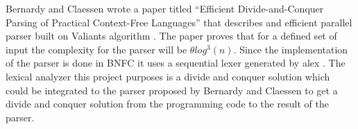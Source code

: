 Bernardy and Claessen \cite{bernardyefficient2013} wrote a paper titled 
``Efficient Divide-and-Conquer Parsing of Practical Context-Free Languages''
that describes and efficient parallel parser built on Valiants algorithm
\cite{valiantgeneral1975}. The paper proves that for a defined set of input
the complexity for the parser will be $\theta log^3(n)$.
Since the implementation of the parser is done in BNFC \cite{bnfc} it uses a
sequential lexer generated by alex \cite{alex}. The lexical analyzer this
project purposes is a divide and conquer solution which could be integrated to
the parser proposed by Bernardy and Claessen to get a divide and conquer
solution from the programming code to the result of the parser.
